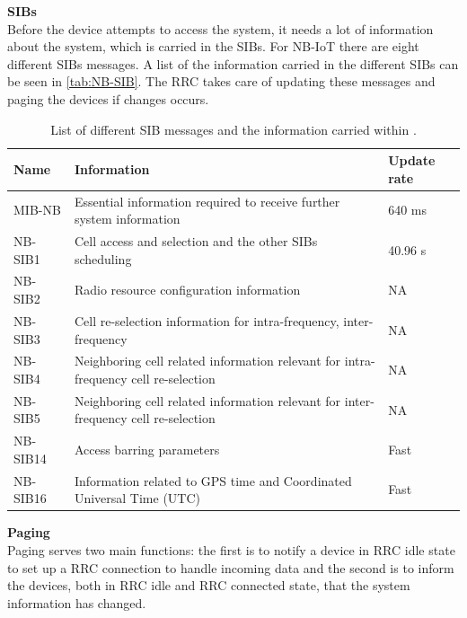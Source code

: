 \textbf{\gls{SIB}s}\\
Before the device attempts to access the system, it needs a lot of information about the system, which is carried in the \gls{SIB}s. For \gls{NB-IoT} there are eight different \gls{SIB}s messages. A list of the information carried in the different \gls{SIB}s can be seen in \autoref{tab:NB-SIB}. The \gls{RRC} takes care of updating these messages and paging the devices if changes occurs.

\begin{table}[H]
\centering
\begin{tabular}{|p{3cm}|p{8cm}|p{3cm}|}\hline
\textbf{Name}		& \textbf{Information}																	& \textbf{Update rate}	\\\hline
\raggedright\arraybackslash\gls{MIB-NB}		& Essential information required to receive further system information 					& 640 ms				\\\hline
\raggedright\arraybackslash\gls{NB-SIB}1		& Cell access and selection and the other SIBs scheduling 										& 40.96 s 				\\\hline
\gls{NB-SIB}2		& Radio resource configuration information 												& NA 					\\\hline
\gls{NB-SIB}3		& Cell re-selection information for intra-frequency, inter-frequency 					& NA 					\\\hline
\gls{NB-SIB}4		& Neighboring cell related information relevant for intra-frequency cell re-selection 	& NA 					\\\hline
\gls{NB-SIB}5		& Neighboring cell related information relevant for inter-frequency cell re-selection 	& NA 					\\\hline
\gls{NB-SIB}14		& Access barring parameters 															& Fast 					\\\hline
\gls{NB-SIB}16		& Information related to GPS time and Coordinated Universal Time (UTC) 					& Fast 					\\\hline
\end{tabular}
\caption{List of different \gls{SIB} messages and the information carried within \citep{whitepaper,REL-13}.}
\label{tab:NB-SIB}
\end{table}

\textbf{Paging} \\
Paging serves two main functions: the first is to notify a device in \gls{RRC} idle state to set up a \gls{RRC} connection to handle incoming data and the second is to inform the devices, both in \gls{RRC} idle and \gls{RRC} connected state, that the system information has changed. \citep[ch. 7]{NB-IoT_Book}


